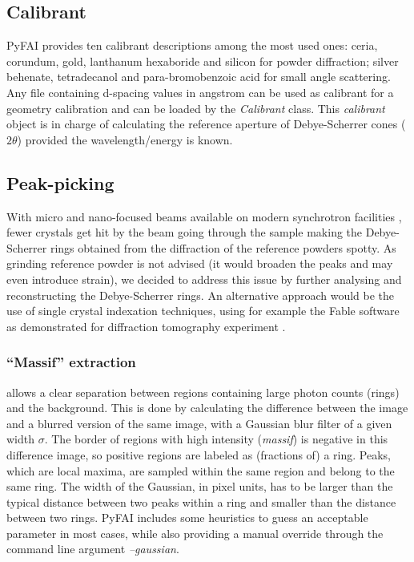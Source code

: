 \documentclass[preprint]{iucr}
\begin{document}
\subsection{Calibrant}
PyFAI provides ten calibrant descriptions among the most used ones: ceria,
corundum, gold, lanthanum hexaboride and silicon for powder diffraction;
silver behenate, tetradecanol and para-bromobenzoic acid for small angle scattering.
Any file containing d-spacing values in angstrom can be used as calibrant for a
geometry calibration and can be loaded by the \textit{Calibrant} class.
This \textit{calibrant} object is in charge of
calculating the reference aperture of Debye-Scherrer cones ($2\theta$) provided the
wavelength/energy is known.

\subsection{Peak-picking}
With micro and nano-focused beams available on modern synchrotron facilities
\cite{id13}, fewer crystals get hit by the beam going through the
sample making the Debye-Scherrer rings obtained from the diffraction of the reference
powders spotty.
As grinding reference powder is not advised (it would broaden the peaks
and may even introduce strain), we decided to
address this issue by further analysing and reconstructing the Debye-Scherrer rings.
An alternative approach would be the use of single crystal indexation techniques, using
for example the Fable software \cite{fable} as demonstrated for diffraction
tomography experiment \cite{bonnin}.

\subsubsection{``Massif'' extraction}
\label{massif}
allows a clear separation between regions containing large
photon counts (rings) and the background.
This is done by calculating the difference between the image and a blurred version 
of the same image, with a Gaussian blur filter of a given width $\sigma$.
The border of regions with high intensity (\textit{massif}) is negative in this
difference image, so positive regions are labeled as 
(fractions of) a ring. Peaks, which are local maxima,
are sampled within the same region and belong to the same ring.
The width of the Gaussian, in pixel units, has to be larger than the typical
distance between two peaks within a ring and smaller than the distance between two
rings.
PyFAI includes some heuristics to guess an acceptable parameter in most cases,
while also providing a manual override through the command line argument \textit{--gaussian}.
\end{document}
